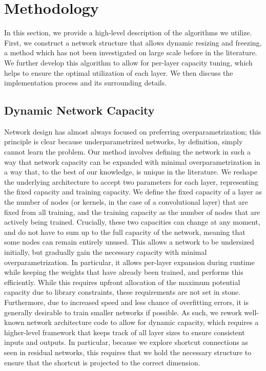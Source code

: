 \chapter{Methodology}
In this section, we provide a high-level description of the algorithms we utilize.
First, we construct a network structure that allows dynamic resizing and freezing, a method which has not been investigated on large scale before in the literature.
We further develop this algorithm to allow for per-layer capacity tuning, which helps to ensure the optimal utilization of each layer.
We then discuss the implementation process and its surrounding details.

\section{Dynamic Network Capacity}
Network design has almost always focused on preferring overparametrization; this principle is clear because underparametrized networks, by definition, simply cannot learn the problem.
Our method involves defining the network in such a way that network capacity can be expanded with minimal overparametrization in a way that, to the best of our knowledge, is unique in the literature.
We reshape the underlying architecture to accept two parameters for each layer, representing the fixed capacity and training capacity.
We define the fixed capacity of a layer as the number of nodes (or kernels, in the case of a convolutional layer) that are fixed from all training, and the training capacity as the number of nodes that are actively being trained.
Crucially, these two capacities can change at any moment, and do not have to sum up to the full capacity of the network, meaning that some nodes can remain entirely unused.
This allows a network to be undersized initially, but gradually gain the necessary capacity with minimal overparametrization.
In particular, it allows per-layer expansion during runtime while keeping the weights that have already been trained, and performs this efficiently.
While this requires upfront allocation of the maximum potential capacity due to library constraints, these requirements are not set in stone.
Furthermore, due to increased speed and less chance of overfitting errors, it is generally desirable to train smaller networks if possible.
As such, we rework well-known network architecture code to allow for dynamic capacity, which requires a higher-level framework that keeps track of all layer sizes to ensure consistent inputs and outputs.
In particular, because we explore shortcut connections as seen in residual networks, this requires that we hold the necessary structure to ensure that the shortcut is projected to the correct dimension.

